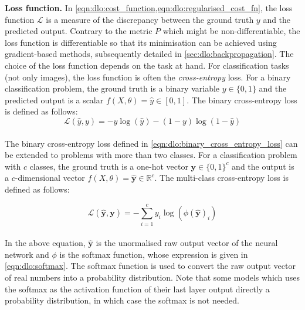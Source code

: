 \noindent\textbf{Loss function.} In
\cref{eqn:dlo:cost_function,eqn:dlo:regularised_cost_fn}, the loss function
$\mathcal{L}$ is a measure of the discrepancy between the ground truth $y$ and
the predicted output. Contrary to the metric $P$ which might be
non-differentiable, the loss function is differentiable so that its minimisation
can be achieved using gradient-based methods, subsequently detailed in
\cref{sec:dlo:backpropagation}. The choice of the loss function depends on the
task at hand. For classification tasks (not only images), the loss function is
often the \emph{cross-entropy} loss. For a binary classification problem, the
ground truth is a binary variable $y\in \{0,1\}$ and the predicted output is a
scalar $f(X,\theta)=\hat{y}\in[0,1]$. The binary cross-entropy loss is defined
as follows:\\

\begin{equation}
  \label{eqn:dlo:binary_cross_entropy_loss}
  \mathcal{L}(\hat{y}, y) = - y \log(\hat{y}) - (1-y) \log(1-\hat{y})
\end{equation}\\

\noindent The binary cross-entropy loss defined in
\cref{eqn:dlo:binary_cross_entropy_loss} can be extended to problems with more
than two classes. For a classification problem with $c$ classes, the ground
truth is a one-hot vector $\mathbf{y}\in \{0,1\}^c$ and the output is a
$c$-dimensional vector $f(X,\theta)=\hat{\mathbf{y}}\in\mathds{R}^c$. The
multi-class cross-entropy loss is defined as follows:

\begin{equation}
  \label{eqn:dlo:multiclass_cross_entropy_loss}
  \mathcal{L}(\hat{\mathbf{y}}, \mathbf{y}) = - \sum_{i=1}^c y_i \log \left( \phi(\mathbf{\hat{y}})_i \right)
\end{equation}\\

\noindent In the above equation, $\hat{\mathbf{y}}$ is the unormalised raw
output vector of the neural network and $\phi$ is the softmax function, whose
expression is given in \cref{eqn:dlo:softmax}. The softmax function is used to
convert the raw output vector of real numbers into a probability distribution.
Note that some models which uses the softmax as the activation function of their
last layer output directly a probability distribution, in which case the softmax
is not needed.\\

